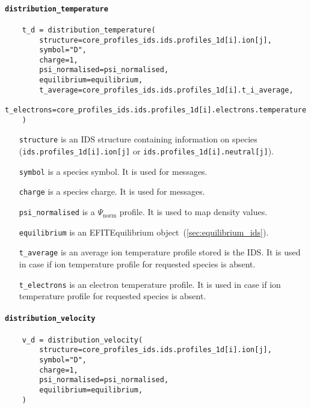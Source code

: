 \documentclass[../main.tex]{subfiles}
\begin{document}
\paragraph{\texttt{distribution\_temperature}}%
\label{par:distribution_temperature}

\begin{verbatim}
    t_d = distribution_temperature(
        structure=core_profiles_ids.ids.profiles_1d[i].ion[j],
        symbol="D",
        charge=1,
        psi_normalised=psi_normalised,
        equilibrium=equilibrium,
        t_average=core_profiles_ids.ids.profiles_1d[i].t_i_average,
        t_electrons=core_profiles_ids.ids.profiles_1d[i].electrons.temperature
    )
\end{verbatim}

\begin{itemize}[align=left]
    \item[\texttt{structure}] is an IDS structure containing information on species (\texttt{ids.profiles\_1d[i].ion[j]} or \texttt{ids.profiles\_1d[i].neutral[j]}).
    \item[\texttt{symbol}] is a species symbol. It is used for messages.
    \item[\texttt{charge}] is a species charge. It is used for messages.
    \item[\texttt{psi\_normalised}] is a $\Psi_\text{norm}$ profile. It is used to map density values.
    \item[\texttt{equilibrium}] is an EFITEquilibrium object~(\cref{sec:equilibrium_ids}).
    \item[\texttt{t\_average}] is an average ion temperature profile stored is the IDS. It is used in case if ion temperature profile for requested species is absent.
    \item[\texttt{t\_electrons}] is an electron temperature profile. It is used in case if ion temperature profile for requested species is absent.
\end{itemize}

\paragraph{\texttt{distribution\_velocity}}%
\label{par:distribution_velocity}

\begin{verbatim}
    v_d = distribution_velocity(
        structure=core_profiles_ids.ids.profiles_1d[i].ion[j],
        symbol="D",
        charge=1,
        psi_normalised=psi_normalised,
        equilibrium=equilibrium,
    )
\end{verbatim}
\end{document}

